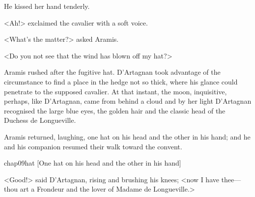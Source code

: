 He kissed her hand tenderly.

<Ah!> exclaimed the cavalier with a soft voice.

<What's the matter?> asked Aramis.

<Do you not see that the wind has blown off my hat?>

Aramis rushed after the fugitive hat. D'Artagnan took advantage of the circumstance to find a place in the hedge not so thick, where his glance could penetrate to the supposed cavalier. At that instant, the moon, inquisitive, perhaps, like D'Artagnan, came from behind a cloud and by her light D'Artagnan recognised the large blue eyes, the golden hair and the classic head of the Duchess de Longueville.

Aramis returned, laughing, one hat on his head and the other in his hand; and he and his companion resumed their walk toward the convent.

\begin{bwbigpic}
	[\basicscale] 
	{chap09hat}
	[One hat on his head and the other in his hand]
\end{bwbigpic}

<Good!> said D'Artagnan, rising and brushing his knees; <now I have thee—thou art a Frondeur and the lover of Madame de Longueville.> 